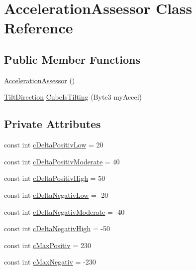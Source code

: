 \hypertarget{class_acceleration_assessor}{\section{Acceleration\+Assessor Class Reference}
\label{class_acceleration_assessor}
}
\subsection*{Public Member Functions}
\begin{DoxyCompactItemize}
\item 
\hyperlink{class_acceleration_assessor_a1d0f9725b631a8a885423ba2761f76d2}{Acceleration\+Assessor} ()
\item 
\hyperlink{_configuration_8cpp_a45350fcfddbf1e93888b462976b0751c}{Tilt\+Direction} \hyperlink{class_acceleration_assessor_a8ba60a363d10333d91195fbec98a337c}{Cube\+Is\+Tilting} (Byte3 my\+Accel)
\end{DoxyCompactItemize}
\subsection*{Private Attributes}
\begin{DoxyCompactItemize}
\item 
const int \hyperlink{class_acceleration_assessor_aacf999cccafbc83bbf898881b82d14c0}{c\+Delta\+Positiv\+Low} = 20
\item 
const int \hyperlink{class_acceleration_assessor_a32d8467cfba8fc770aa4af2835bd9ab7}{c\+Delta\+Positiv\+Moderate} = 40
\item 
const int \hyperlink{class_acceleration_assessor_adc6aad5920bddf022ae7e8918458728c}{c\+Delta\+Positiv\+High} = 50
\item 
const int \hyperlink{class_acceleration_assessor_a2aa36babea6c7b5c50f1274c368a7453}{c\+Delta\+Negativ\+Low} = -\/20
\item 
const int \hyperlink{class_acceleration_assessor_a055c732fba4149262e248745066add91}{c\+Delta\+Negativ\+Moderate} = -\/40
\item 
const int \hyperlink{class_acceleration_assessor_af4084d41b19e6ff02f97d6c38f18ef0c}{c\+Delta\+Negativ\+High} = -\/50
\item 
const int \hyperlink{class_acceleration_assessor_a1c4b1fe844d38dcb4985a6b887b2622a}{c\+Max\+Positiv} = 230
\item 
const int \hyperlink{class_acceleration_assessor_a69ee556f7aea51f507ef1b314e5e4630}{c\+Max\+Negativ} = -\/230
\end{DoxyCompactItemize}


